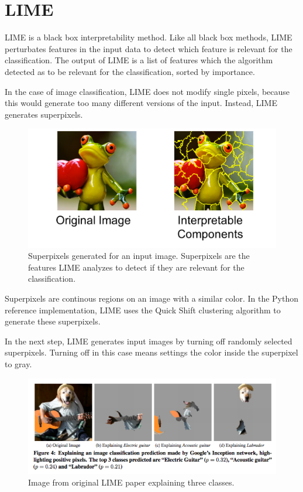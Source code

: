 \section{LIME}

LIME \cite{ribeiro2016should} is a black box interpretability method. Like all black box methods, LIME perturbates features in the input data to detect which feature is relevant for the classification. The output of LIME is a list of features which the algorithm detected as to be relevant for the classification, sorted by importance.

In the case of image classification, LIME does not modify single pixels, because this would generate too many different versions of the input.
Instead, LIME generates superpixels.

\begin{figure}[H]
\centering
\includegraphics[width=14cm]{chapters/02_methods/images/lime.jpg}
\caption{Superpixels generated for an input image. Superpixels are the features LIME analyzes to detect if they are relevant for the classification.}
\end{figure}

Superpixels are continous regions on an image with a similar color. In the Python reference implementation, LIME uses the Quick Shift \cite{vedaldi2008quick} clustering algorithm to generate these superpixels.

In the next step, LIME generates input images by turning off randomly selected superpixels. Turning off in this case means settings the color inside the superpixel to gray.



\begin{figure}[H]
\centering
\includegraphics[width=14cm]{chapters/02_methods/images/lime.png}
\caption{Image from original LIME paper explaining three classes.}
\end{figure}

